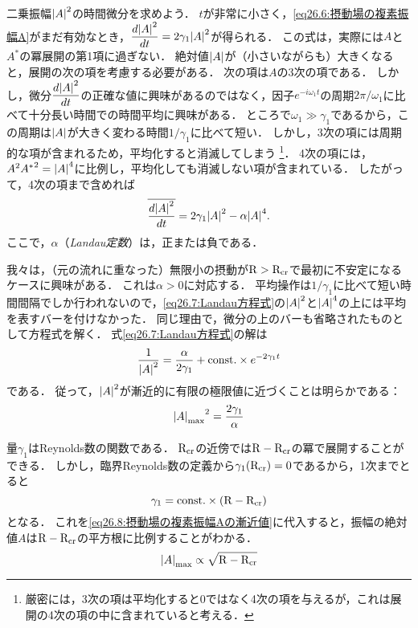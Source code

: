 二乗振幅$\abs{A}^2$の時間微分を求めよう．
$t$が非常に小さく，\eqref{eq26.6:摂動場の複素振幅A}がまだ有効なとき，$\ddv{\abs{A}^2}{t}=2\gamma_1\abs{A}^2$が得られる．
この式は，実際には$A$と$A^*$の冪展開の第1項に過ぎない．
絶対値$\abs{A}$が（小さいながらも）大きくなると，展開の次の項を考慮する必要がある．
次の項は$A$の3次の項である．
しかし，微分$\ddv{\abs{A}^2}{t}$の正確な値に興味があるのではなく，因子$e^{-i\omega_1t}$の周期$2\pi/\omega_1$に比べて十分長い時間での時間平均に興味がある．
ところで$\omega_1 \gg \gamma_1$であるから，この周期は$\abs{A}$が大きく変わる時間$1/\gamma_1$に比べて短い．
しかし，3次の項には周期的な項が含まれるため，平均化すると消滅してしまう
\footnote{厳密には，3次の項は平均化すると0ではなく4次の項を与えるが，これは展開の4次の項の中に含まれていると考える．}．
4次の項には，$A^2{A^*}^2 = \abs{A}^4$に比例し，平均化しても消滅しない項が含まれている．
したがって，4次の項まで含めれば
\begin{equation}\label{eq26.7:Landau方程式}
    \overline{ \dv{\abs{A}^2}{t} } = 2\gamma_1 \abs{A}^2 - \alpha \abs{A}^4 .
\end{equation}
ここで，$\alpha$（\emph{Landau定数}）は，正または負である．


我々は，（元の流れに重なった）無限小の摂動が$\mathrm{R}>\mathrm{R}_{\mathrm{cr}}$で最初に不安定になるケースに興味がある．
これは$\alpha>0$に対応する．
平均操作は$1/\gamma_1$に比べて短い時間間隔でしか行われないので，\eqref{eq26.7:Landau方程式}の$\abs{A}^2$と$\abs{A}^4$の上には平均を表すバーを付けなかった．
同じ理由で，微分の上のバーも省略されたものとして方程式を解く．
式\eqref{eq26.7:Landau方程式}の解は
\[
    \frac{1}{\abs{A}^2} = \frac{\alpha}{2\gamma_1} + \mathrm{const.}\times e^{-2\gamma_1t}
\]
である．
従って，$\abs{A}^2$が漸近的に有限の極限値に近づくことは明らかである：
\begin{equation}\label{eq26.8:摂動場の複素振幅Aの漸近値}
    {\abs{A}_\textrm{max}}^2 = \frac{2\gamma_1}{\alpha}
\end{equation}


量$\gamma_1$はReynolds数の関数である．
$\mathrm{R}_{\mathrm{cr}}$の近傍では$\mathrm{R}-\mathrm{R}_{\mathrm{cr}}$の冪で展開することができる．
しかし，臨界Reynolds数の定義から$\gamma_1(\mathrm{R}_{\mathrm{cr}})=0$であるから，1次までとると
\begin{equation}\label{eq26.9:Landau方程式のγのRによる展開}
    \gamma_1 = \mathrm{const.}\times(\mathrm{R}-\mathrm{R}_\textrm{cr})
\end{equation}
となる．
これを\eqref{eq26.8:摂動場の複素振幅Aの漸近値}に代入すると，振幅の絶対値$A$は$\mathrm{R}-\mathrm{R}_{\mathrm{cr}}$の平方根に比例することがわかる．
\begin{equation}\label{eq26.10:摂動場の複素振幅AのRによる展開}
    \abs{A}_\textrm{max} \propto \sqrt{\mathrm{R}-\mathrm{R}_\textrm{cr}}
\end{equation}


